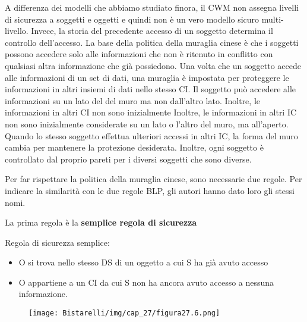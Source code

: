 A differenza dei modelli che abbiamo studiato finora, il CWM non assegna livelli di sicurezza a soggetti e oggetti e quindi non è un vero modello sicuro multi-livello. Invece, la storia del precedente accesso di un soggetto determina il controllo dell'accesso. La base della politica della muraglia cinese è che i soggetti possono accedere solo alle informazioni che non è ritenuto in conflitto con qualsiasi altra informazione che già possiedono. Una volta che un soggetto accede alle informazioni di un set di dati, una muraglia è impostata per proteggere le informazioni in altri insiemi di dati nello stesso CI. Il soggetto può accedere alle informazioni su un lato del del muro ma non dall'altro lato. Inoltre, le informazioni in altri CI non sono inizialmente Inoltre, le informazioni in altri IC non sono inizialmente considerate su un lato o l'altro del muro, ma all'aperto. Quando lo stesso soggetto effettua ulteriori accessi in altri IC, la forma del muro cambia per mantenere la protezione desiderata. Inoltre, ogni soggetto è controllato dal proprio pareti per i diversi soggetti che sono diverse.

\singlespacing

Per far rispettare la politica della muraglia cinese, sono necessarie due regole. Per indicare la similarità con le due regole BLP, gli autori hanno dato loro gli stessi nomi.

\singlespacing

\begin{center}
    La prima regola è la \textbf{semplice regola di sicurezza}
\end{center}
Regola di sicurezza semplice:
\begin{itemize}
    \item O si trova nello stesso DS di un oggetto a cui S ha già avuto accesso
    \item O appartiene a un CI da cui S non ha ancora avuto accesso a nessuna informazione.
\end{itemize}

\begin{figure}[H]
	\centering
    \texttt{[image: Bistarelli/img/cap\_27/figura27.6.png]}
\end{figure}


